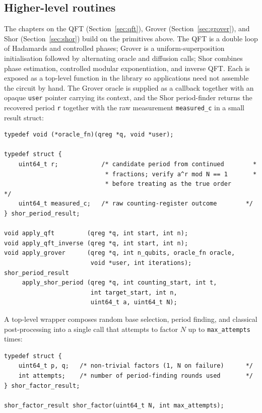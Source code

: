 \subsection{Higher-level routines}

The chapters on the QFT (Section~\ref{sec:qft}), Grover (Section~\ref{sec:grover}), and Shor (Section~\ref{sec:shor}) build on the primitives above. The QFT is a double loop of Hadamards and controlled phases; Grover is a uniform-superposition initialisation followed by alternating oracle and diffusion calls; Shor combines phase estimation, controlled modular exponentiation, and inverse QFT. Each is exposed as a top-level function in the library so applications need not assemble the circuit by hand. The Grover oracle is supplied as a callback together with an opaque \texttt{user} pointer carrying its context, and the Shor period-finder returns the recovered period \texttt{r} together with the raw measurement \texttt{measured\_c} in a small result struct:

\begin{lstlisting}
typedef void (*oracle_fn)(qreg *q, void *user);

typedef struct {
    uint64_t r;            /* candidate period from continued        *
                            * fractions; verify a^r mod N == 1       *
                            * before treating as the true order      */
    uint64_t measured_c;   /* raw counting-register outcome        */
} shor_period_result;

void apply_qft         (qreg *q, int start, int n);
void apply_qft_inverse (qreg *q, int start, int n);
void apply_grover      (qreg *q, int n_qubits, oracle_fn oracle,
                        void *user, int iterations);
shor_period_result
     apply_shor_period (qreg *q, int counting_start, int t,
                        int target_start, int n,
                        uint64_t a, uint64_t N);
\end{lstlisting}

A top-level wrapper composes random base selection, period finding, and classical post-processing into a single call that attempts to factor $N$ up to \texttt{max\_attempts} times:
\begin{lstlisting}
typedef struct {
    uint64_t p, q;   /* non-trivial factors (1, N on failure)      */
    int attempts;    /* number of period-finding rounds used       */
} shor_factor_result;

shor_factor_result shor_factor(uint64_t N, int max_attempts);
\end{lstlisting}

